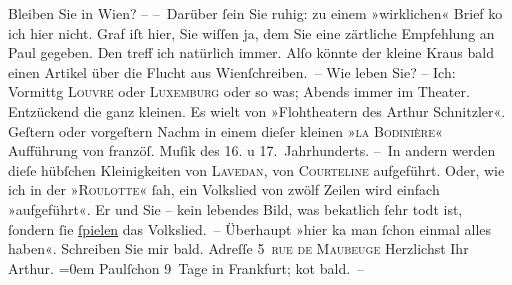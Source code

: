 \begin{ledgroupsized}[t]{13cm}
           \pstart
           Bleiben Sie in Wien? – \pend
           \pstart
           – Darüber ſein Sie ruhig: zu einem »wirklichen« Brief ko{\geminationm} ich hier nicht.\pend
           \pstart
           Graf iſt hier, Sie wiſſen ja, dem Sie eine
               zärtliche Empfehlung an Paul gegeben. Den treff
               ich natürlich immer. {\pb}Alſo könnte der kleine Kraus bald einen Artikel über die Flucht aus Wienſchreiben. –\pend
           \pstart
           Wie leben Sie? – \pend
           \pstart
           Ich: Vormittg \textsc{Louvre} oder \textsc{Luxemburg} oder so was; Abends immer im Theater. Entzückend die ganz kleinen. Es wi{\geminationm}elt von »Flohtheatern des Arthur Schnitzler«.\pend
           \pstart
           {\pb}Geſtern oder vorgeſtern Nachm in einem dieſer
               kleinen »\textsc{la Bodinière}« Aufführung von \introOben{}franzöſ.\introOben{} Muſik des 16. u 17. Jahrhunderts.\pend
           \pstart
           – In andern werden dieſe hübſchen Kleinigkeiten von \textsc{Lavedan}, von \textsc{Courteline} aufgeführt. Oder, wie ich \label{K_L00670_2v}\label{K_L00670_2h} in der »\textsc{Roulotte}« ſah, ein Volkslied von zwölf Zeilen wird einfach »aufgeführt«. Er und {\pb}Sie – kein lebendes Bild, was beka{\geminationn}tlich ſehr
               todt ist, ſondern ſie \uline{ſpielen} das Volkslied. –\pend
           \pstart
           Überhaupt »hier ka{\geminationn} man ſchon einmal alles haben«.\pend
           \pstart
           Schreiben Sie mir bald.\pend
           \pstart
           Adreſſe 5 \textsc{rue de Maubeuge}\pend
           \pstart
           Herzlichst Ihr{\\[\baselineskip]}\spacefill\mbox{Arthur.}\pend
           \leftskip=0em{}\pstart
           Paulſchon 9 Tage in Frankfurt; ko{\geminationm}t bald. –\pend
           

\end{ledgroupsized}
